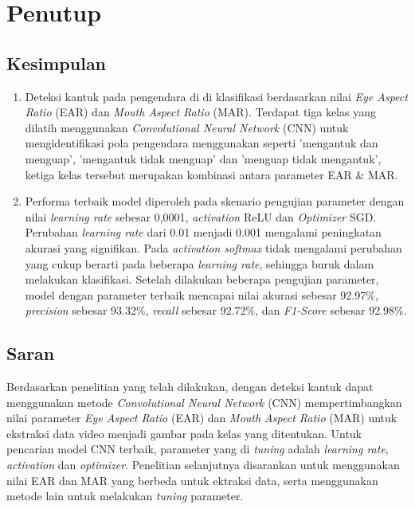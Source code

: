 \chapter{Penutup}

\section{Kesimpulan}

    \begin{enumerate}
        \item Deteksi kantuk pada pengendara di di klasifikasi berdasarkan nilai \textit{Eye Aspect Ratio} (EAR) dan \textit{Mouth Aspect Ratio} (MAR).
        Terdapat tiga kelas yang dilatih menggunakan \textit{Convolutional Neural Network} (CNN) untuk mengidentifikasi pola pengendara menggunakan seperti ’mengantuk dan menguap’, ’mengantuk tidak menguap’ dan ’menguap tidak mengantuk’, ketiga kelas tersebut merupakan kombinasi antara parameter EAR \& MAR.
        
        \item Performa terbaik model diperoleh pada skenario pengujian parameter dengan nilai \textit{learning rate} sebesar 0,0001, \textit{activation} ReLU dan \textit{Optimizer} SGD. Perubahan \textit{learning rate} dari 0.01 menjadi 0.001 mengalami peningkatan akurasi yang signifikan. Pada \textit{activation softmax} tidak mengalami perubahan yang cukup berarti pada beberapa \textit{learning rate}, sehingga buruk dalam melakukan klasifikasi. Setelah dilakukan beberapa pengujian parameter, model dengan parameter terbaik mencapai nilai akurasi sebesar 92.97\%, \textit{precision} sebesar 93.32\%, \textit{recall} sebesar 92.72\%, dan \textit{F1-Score} sebesar 92.98\%.
    \end{enumerate}


\section{Saran}

Berdasarkan penelitian yang telah dilakukan, dengan deteksi kantuk dapat menggunakan metode \textit{Convolutional Neural Network} (CNN) mempertimbangkan nilai parameter \textit{Eye Aspect Ratio} (EAR) dan \textit{Mouth Aspect Ratio} (MAR) untuk ekstraksi data video menjadi gambar pada kelas yang ditentukan. Untuk pencarian model CNN terbaik, parameter yang di \textit{tuning} adalah \textit{learning rate}, \textit{activation} dan \textit{optimizer}. Penelitian selanjutnya disarankan untuk menggunakan nilai EAR dan MAR yang berbeda untuk ektraksi data, serta menggunakan metode lain untuk melakukan \textit{tuning} parameter.








